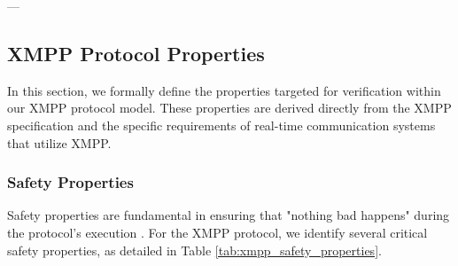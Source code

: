 ---

\subsection{XMPP Protocol Properties}

In this section, we formally define the properties targeted for verification within our XMPP protocol model. These properties are derived directly from the XMPP specification \cite{rfc6120} and the specific requirements of real-time communication systems that utilize XMPP.

\subsubsection{Safety Properties}
Safety properties are fundamental in ensuring that "nothing bad happens" during the protocol's execution \cite{baier2008principles}. For the XMPP protocol, we identify several critical safety properties, as detailed in Table \ref{tab:xmpp_safety_properties}.

